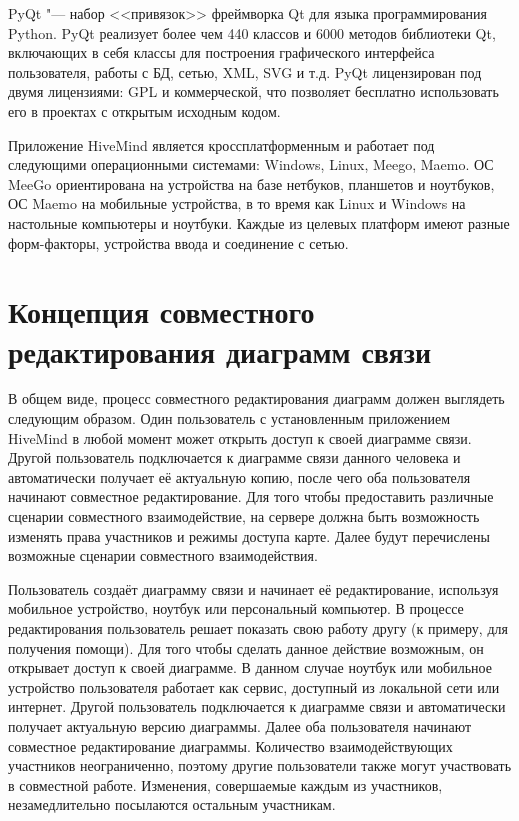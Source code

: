 PyQt "--- набор <<привязок>> фреймворка Qt для языка программирования Python.
PyQt реализует более чем 440 классов и 6000 методов библиотеки Qt, включающих в
себя классы для построения графического интерфейса пользователя, работы с БД,
сетью, XML, SVG и т.д. PyQt лицензирован под двумя лицензиями: GPL и
коммерческой, что позволяет бесплатно использовать его в проектах с открытым
исходным кодом.

Приложение HiveMind является кроссплатформенным и работает под следующими
операционными системами: Windows, Linux, Meego, Maemo. ОС MeeGo ориентирована на
устройства на базе нетбуков, планшетов и ноутбуков, ОС Maemo на мобильные
устройства, в то время как Linux и Windows на настольные компьютеры и ноутбуки.
Каждые из целевых платформ имеют разные форм-факторы, устройства ввода и
соединение с сетью.


\section{Концепция совместного редактирования диаграмм связи}
\label{sec:collaborative_mindmapping}

В общем виде, процесс совместного редактирования диаграмм должен выглядеть
следующим образом. Один пользователь с установленным приложением HiveMind в
любой момент может открыть доступ к своей диаграмме связи. Другой пользователь
подключается к диаграмме связи данного человека и автоматически получает её
актуальную копию, после чего оба пользователя начинают совместное
редактирование. Для того чтобы предоставить различные сценарии
совместного взаимодействие, на сервере должна быть возможность изменять права
участников и режимы доступа карте. Далее будут перечислены возможные сценарии
совместного взаимодействия.

Пользователь создаёт диаграмму связи и начинает её редактирование, используя
мобильное устройство, ноутбук или персональный компьютер. В процессе
редактирования пользователь решает показать свою работу другу (к примеру, для
получения помощи). Для того чтобы сделать данное действие возможным, он
открывает доступ к своей диаграмме. В данном случае ноутбук или мобильное
устройство пользователя работает как сервис, доступный из локальной сети или
интернет. Другой пользователь подключается к диаграмме связи и автоматически
получает актуальную версию диаграммы. Далее оба пользователя начинают совместное
редактирование диаграммы. Количество взаимодействующих участников неограниченно,
поэтому другие пользователи также могут участвовать в совместной работе.
Изменения, совершаемые каждым из участников, незамедлительно посылаются
остальным участникам.

